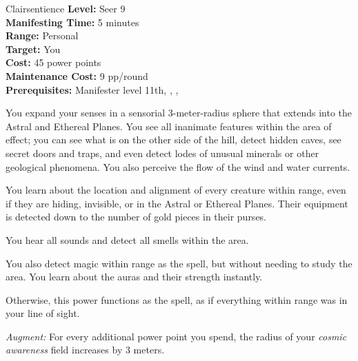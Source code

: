 {Clairsentience}
{
	\textbf{Level:}
	Seer 9\\
	\textbf{Manifesting Time:}
	5 minutes\\
	\textbf{Range:}
	Personal\\
	\textbf{Target:}
	You\\
	\textbf{Cost:}
	45 power points\\
	\textbf{Maintenance Cost:}
	9 pp/round\\
	\textbf{Prerequisites:}
	Manifester level 11th, , , \\
}
{
	You expand your senses in a sensorial 3-meter-radius sphere that extends into the Astral and Ethereal Planes. You see all inanimate features within the area of effect; you can see what is on the other side of the hill, detect hidden caves, see secret doors and traps, and even detect lodes of unusual minerals or other geological phenomena. You also perceive the flow of the wind and water currents.

	You learn about the location and alignment of every creature within range, even if they are hiding, invisible, or in the Astral or Ethereal Planes. Their equipment is detected down to the number of gold pieces in their purses.

	You hear all sounds and detect all smells within the area.

	You also detect magic within range as the  spell, but without needing to study the area. You learn about the auras and their strength instantly.

	Otherwise, this power functions as the  spell, as if everything within range was in your line of sight.

	\textit{Augment:} For every additional power point you spend, the radius of your \emph{cosmic awareness} field increases by 3 meters.
}